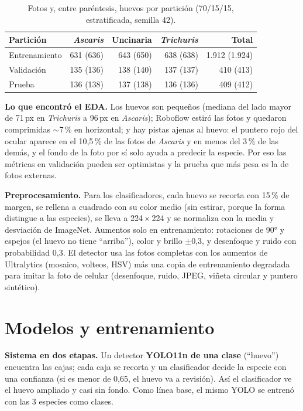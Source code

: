 \documentclass[10pt,letterpaper]{article}
\begin{document}
\begin{table}[h]
\centering\small
\caption{Fotos y, entre paréntesis, huevos por partición (70/15/15, estratificada, semilla 42).}
\label{tab:datos}
\begin{tabular}{lrrrr}
\toprule
Partición & \textit{Ascaris} & Uncinaria & \textit{Trichuris} & Total \\
\midrule
Entrenamiento & 631 (636) & 643 (650) & 638 (638) & 1.912 (1.924) \\
Validación    & 135 (136) & 138 (140) & 137 (137) &   410 (413) \\
Prueba        & 136 (138) & 137 (138) & 136 (136) &   409 (412) \\
\bottomrule
\end{tabular}
\end{table}

\textbf{Lo que encontró el EDA.} Los huevos son pequeños (mediana del lado mayor de 71\,px en \textit{Trichuris} a 96\,px en \textit{Ascaris}); Roboflow estiró las fotos y quedaron comprimidas $\sim$7\,\% en horizontal; y hay pistas ajenas al huevo: el puntero rojo del ocular aparece en el 10,5\,\% de las fotos de \textit{Ascaris} y en menos del 3\,\% de las demás, y el fondo de la foto por sí solo ayuda a predecir la especie. Por eso las métricas en validación pueden ser optimistas y la prueba que más pesa es la de fotos externas.

\textbf{Preprocesamiento.} Para los clasificadores, cada huevo se recorta con 15\,\% de margen, se rellena a cuadrado con su color medio (sin estirar, porque la forma distingue a las especies), se lleva a 224\,$\times$\,224 y se normaliza con la media y desviación de ImageNet. Aumentos solo en entrenamiento: rotaciones de 90° y espejos (el huevo no tiene ``arriba''), color y brillo $\pm$0,3, y desenfoque y ruido con probabilidad 0,3. El detector usa las fotos completas con los aumentos de Ultralytics (mosaico, volteos, HSV) más una copia de entrenamiento degradada para imitar la foto de celular (desenfoque, ruido, JPEG, viñeta circular y puntero sintético).

\section{Modelos y entrenamiento}

\textbf{Sistema en dos etapas.} Un detector \textbf{YOLO11n de una clase} (``huevo'') encuentra las cajas; cada caja se recorta y un clasificador decide la especie con una confianza (si es menor de 0,65, el huevo va a revisión). Así el clasificador ve el huevo ampliado y casi sin fondo. Como línea base, el mismo YOLO se entrenó con las 3 especies como clases.
\end{document}
